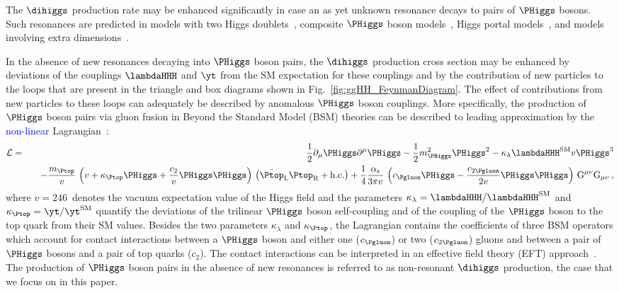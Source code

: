 The $\dihiggs$ production rate may be enhanced significantly in case an as yet unknown resonance decays to pairs of $\PHiggs$ bosons.
Such resonances are predicted in models with two Higgs doublets~\cite{Craig:2013hca,Nhung:2013lpa}, composite $\PHiggs$ boson models~\cite{Grober:2010yv,Contino:2010mh}, 
Higgs portal models~\cite{Englert:2011yb,No:2013wsa}, and models involving extra dimensions~\cite{Randall:1999ee}.

In the absence of new resonances decaying into $\PHiggs$ boson pairs,
the $\dihiggs$ production cross section may be enhanced by deviations of the couplings $\lambdaHHH$ and $\yt$ from the SM expectation for these couplings
and by the contribution of new particles to the loops 
that are present in the triangle and box diagrams shown in Fig.~\ref{fig:ggHH_FeynmanDiagram}.
The effect of contributions from new particles to these loops can adequately be described by anomalous $\PHiggs$ boson couplings.
More specifically,
the production of $\PHiggs$ boson pairs via gluon fusion in Beyond the Standard Model (BSM) theories can be described to leading approximation by the \textcolor{blue}{non-linear}  Lagrangian~\cite{Buchmuller:1985jz}:
\begin{eqnarray}
\mathcal{L} & = & \frac{1}{2} \partial_{\mu}\PHiggs\partial^{\mu}\PHiggs - \frac{1}{2} m_{\PHiggs}^{2} \PHiggs^{2} - \kappa_{\lambda} \lambdaHHH^{\textrm{SM}} v \PHiggs^{3} \nonumber \\
 & & \quad -\frac{m_{\Ptop}}{v} \, \left( v + \kappa_{\Ptop} \PHiggs + \frac{c_{2}}{v} \PHiggs\PHiggs \right) \, \left( \bar{\Ptop}_{\textrm{L}} \Ptop_{\textrm{R}} + \textrm{h.c.} \right) 
+ \frac{1}{4} \frac{\alpha_{\textrm{s}}}{3 \pi v} \, \left( c_{\Pgluon} \PHiggs - \frac{c_{2\Pgluon}}{2 v} \PHiggs\PHiggs \right) \, \textrm{G}^{\mu\nu}\textrm{G}_{\mu\nu} \, ,
\end{eqnarray}
where $v = 246$~\GeV denotes the vacuum expectation value of the Higgs field
and the parameters $\kappa_{\lambda} = \lambdaHHH/\lambdaHHH^{\textrm{SM}}$ and $\kappa_{\Ptop} = \yt/\yt^{\textrm{SM}}$ 
quantify the deviations of the trilinear $\PHiggs$ boson self-coupling and of the coupling of the $\PHiggs$ boson to the top quark from their SM values.
Besides the two parameters $\kappa_{\lambda}$ and $\kappa_{\Ptop}$,
the Lagrangian contains the coefficients of three BSM operators which account for contact interactions 
between a $\PHiggs$ boson and either one ($c_{\Pgluon}$) or two ($c_{2\Pgluon}$) gluons
and between a pair of $\PHiggs$ bosons and a pair of top quarks ($c_{2}$).
The contact interactions can be interpreted in an effective field theory (EFT) approach~\cite{Buchalla:2015wfa, Goertz:2014qta}.
The production of $\PHiggs$ boson pairs in the absence of new resonances is referred to as non-resonant $\dihiggs$ production,
the case that we focus on in this paper.


